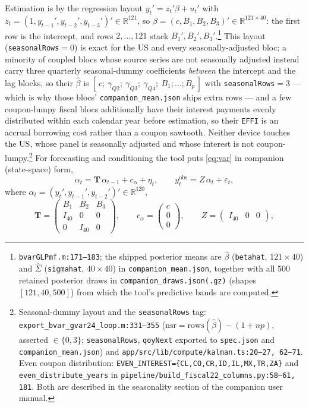 \documentclass[11pt]{article}
\newcommand{\code}[1]{\texttt{\small #1}}
\begin{document}
Estimation is by the regression layout $y_t' = z_t'\beta + u_t'$ with
$z_t = (1, y_{t-1}', y_{t-2}', y_{t-3}')' \in \mathbb{R}^{121}$, so
$\beta = (c, B_1, B_2, B_3)' \in \mathbb{R}^{121\times40}$: the first row is the intercept, and
rows $2,\dots,121$ stack $B_1', B_2', B_3'$.\footnote{\code{bvarGLPmf.m:171--183};
the shipped posterior means are $\hat\beta$ (\code{betahat}, $121\times40$) and $\hat\Sigma$
(\code{sigmahat}, $40\times40$) in \code{companion\_mean.json}, together with all 500 retained
posterior draws in \code{companion\_draws.json(.gz)} (shapes $[121,40,500]$) from which the
tool's predictive bands are computed.} This layout (\code{seasonalRows}${}=0$) is exact for the
US and every seasonally-adjusted bloc; a minority of coupled blocs whose source series are not
seasonally adjusted instead carry three quarterly seasonal-dummy coefficients \emph{between} the
intercept and the lag blocks, so their $\hat\beta$ is
$[\,c;\ \gamma_{Q2};\ \gamma_{Q3};\ \gamma_{Q4};\ B_1;\dots;B_p\,]$ with \code{seasonalRows}${}=3$
--- which is why those blocs' \code{companion\_mean.json} ships extra rows --- and a few
coupon-lumpy fiscal blocs additionally have their interest payments evenly distributed within each
calendar year before estimation, so their \code{EFFI} is an accrual borrowing cost rather than a
coupon sawtooth. Neither device touches the US, whose panel is seasonally adjusted and whose
interest is not coupon-lumpy.\footnote{Seasonal-dummy layout and the \code{seasonalRows} tag:
\code{export\_bvar\_gvar24\_loop.m:331--355} ($\text{nsr}=\text{rows}(\hat\beta)-(1+np)$, asserted
$\in\{0,3\}$; \code{seasonalRows}, \code{qoyNext} exported to \code{spec.json} and
\code{companion\_mean.json}) and \code{app/src/lib/compute/kalman.ts:20--27, 62--71}. Even coupon
distribution: \code{EVEN\_INTEREST=\{CL,CO,CR,ID,IL,MX,TR,ZA\}} and \code{even\_distribute\_years}
in \code{pipeline/build\_fiscal22\_columns.py:58--61, 181}. Both are described in the seasonality
section of the companion user manual.} For forecasting and conditioning the tool puts \eqref{eq:var} in
companion (state-space) form,
\begin{equation}\label{eq:companion}
  \alpha_t = \mathbf{T}\,\alpha_{t-1} + c_\alpha + \eta_t, \qquad
  y^{\mathrm{obs}}_t = Z\,\alpha_t + \varepsilon_t,
\end{equation}
where $\alpha_t = (y_t', y_{t-1}', y_{t-2}')' \in \mathbb{R}^{120}$,
\[
  \mathbf{T} =
  \begin{pmatrix}
    B_1 & B_2 & B_3 \\
    I_{40} & 0 & 0 \\
    0 & I_{40} & 0
  \end{pmatrix},
  \qquad
  c_\alpha = \begin{pmatrix} c \\ 0 \\ 0 \end{pmatrix},
  \qquad
  Z = \begin{pmatrix} I_{40} & 0 & 0 \end{pmatrix},
\]
\end{document}
